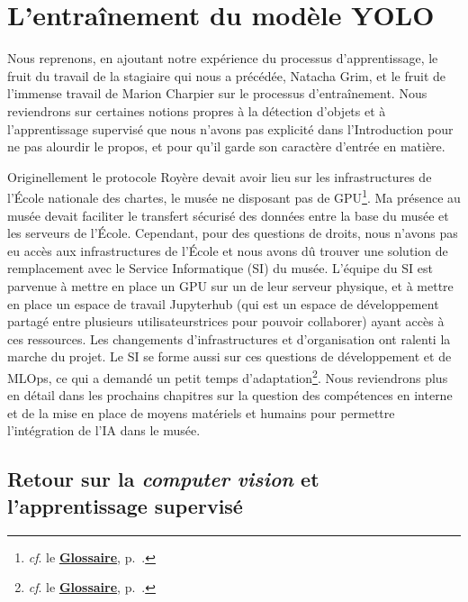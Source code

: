 \section{L'entraînement du modèle YOLO}

Nous reprenons, en ajoutant notre expérience du processus d'apprentissage, le fruit du travail de la stagiaire qui nous a précédée, Natacha Grim, et le fruit de l'immense travail de Marion Charpier sur le processus d'entraînement. Nous reviendrons sur certaines notions propres à la détection d'objets et à l'apprentissage supervisé que nous n'avons pas explicité dans l'Introduction pour ne pas alourdir le propos, et pour qu'il garde son caractère d'entrée en matière. 

Originellement le protocole Royère devait avoir lieu sur les infrastructures de l'École nationale des chartes, le musée ne disposant pas de GPU\footnote{\textit{cf}. le \textbf{\hyperref[sec:Glossaire]{Glossaire}}, p.~\pageref{sec:Glossaire}.}. Ma présence au musée devait faciliter le transfert sécurisé des données entre la base du musée et les serveurs de l'École. Cependant, pour des questions de droits, nous n'avons pas eu accès aux infrastructures de l'École et nous avons dû trouver une solution de remplacement avec le Service Informatique (SI) du musée. L'équipe du SI est parvenue à mettre en place un GPU sur un de leur serveur physique, et à mettre en place un espace de travail Jupyterhub (qui est un espace de développement partagé entre plusieurs utilisateurs\wokisme trices pour pouvoir collaborer) ayant accès à ces ressources. Les changements d'infrastructures et d'organisation ont ralenti la marche du projet. Le SI se forme aussi sur ces questions de développement et de MLOps, ce qui a demandé un petit temps d'adaptation\footnote{\textit{cf}. le \textbf{\hyperref[sec:Glossaire]{Glossaire}}, p.~\pageref{sec:Glossaire}.}. Nous reviendrons plus en détail dans les prochains chapitres sur la question des compétences en interne et de la mise en place de moyens matériels et humains pour permettre l'intégration de l'IA dans le musée.

\subsection{Retour sur la \textit{computer vision} et l'apprentissage supervisé}

